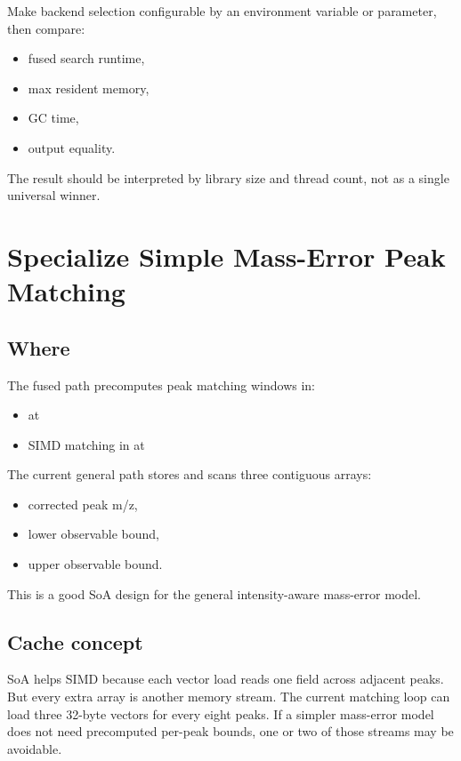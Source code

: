 \documentclass[11pt]{article}
\begin{document}
Make backend selection configurable by an environment variable or parameter,
then compare:

\begin{itemize}
  \item fused search runtime,
  \item max resident memory,
  \item GC time,
  \item output equality.
\end{itemize}

The result should be interpreted by library size and thread count, not as a
single universal winner.

\section{Specialize Simple Mass-Error Peak Matching}

\subsection*{Where}

The fused path precomputes peak matching windows in:

\begin{itemize}
  \item {} at 
  \item SIMD matching in  at 
\end{itemize}

The current general path stores and scans three contiguous arrays:

\begin{itemize}
  \item corrected peak m/z,
  \item lower observable bound,
  \item upper observable bound.
\end{itemize}

This is a good SoA design for the general intensity-aware mass-error model.

\subsection*{Cache concept}

SoA helps SIMD because each vector load reads one field across adjacent peaks.
But every extra array is another memory stream. The current matching loop can
load three 32-byte vectors for every eight peaks. If a simpler mass-error model
does not need precomputed per-peak bounds, one or two of those streams may be
avoidable.
\end{document}
